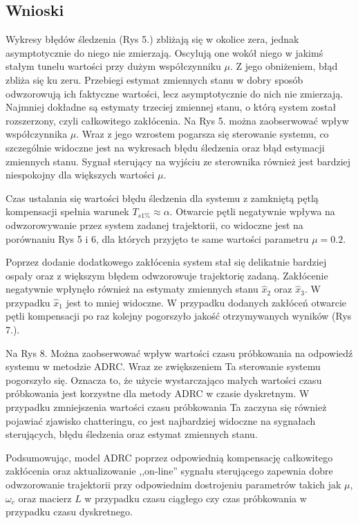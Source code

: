 \documentclass[10pt, a4paper]{article}
\begin{document}
\subsection{Wnioski}
Wykresy błędów śledzenia (Rys 5.) zbliżają się w okolice zera, jednak asymptotycznie do niego nie zmierzają. Oscylują one wokół niego w jakimś stałym tunelu wartości przy dużym współczynniku  $\mu$. Z jego obniżeniem, błąd zbliża się ku zeru. Przebiegi estymat zmiennych stanu w dobry sposób odwzorowują ich faktyczne wartości, lecz asymptotycznie do nich nie zmierzają. Najmniej dokładne są estymaty trzeciej zmiennej stanu, o którą system został rozszerzony, czyli całkowitego zakłócenia.
Na Rys 5. można zaobserwować wpływ współczynnika $\mu$. Wraz z jego wzrostem pogarsza się sterowanie systemu, co szczególnie widoczne jest na wykresach błędu śledzenia oraz błąd estymacji zmiennych stanu. Sygnał sterujący na wyjściu ze sterownika również jest bardziej niespokojny dla większych wartości $\mu$.

Czas ustalania się wartości błędu śledzenia dla systemu z zamkniętą pętlą kompensacji spełnia warunek $T_{s1\%}\approx \alpha$. Otwarcie pętli negatywnie wpływa na odwzorowywanie przez system zadanej trajektorii, co widoczne jest na porównaniu Rys 5 i 6, dla których przyjęto te same wartości parametru $\mu = 0.2$.

Poprzez dodanie dodatkowego zakłócenia system stał się delikatnie bardziej ospały oraz z większym błędem odwzorowuje trajektorię zadaną. Zakłócenie negatywnie wpłynęło również na estymaty zmiennych stanu $\hat{x}_2$ oraz $\hat{x}_3$. W przypadku $\hat{x}_1$ jest to mniej widoczne. W przypadku dodanych zakłóceń otwarcie pętli kompensacji po raz kolejny pogorszyło jakość otrzymywanych wyników (Rys 7.).

Na Rys 8. Można zaobserwować wpływ wartości czasu próbkowania na odpowiedź systemu w metodzie ADRC. Wraz ze zwiększeniem Ta sterowanie systemu pogorszyło się. Oznacza to, że użycie wystarczająco małych wartości czasu próbkowania jest korzystne dla metody ADRC w czasie dyskretnym. W  przypadku zmniejszenia wartości czasu próbkowania Ta zaczyna się również pojawiać zjawisko chatteringu, co jest najbardziej widoczne na sygnałach sterujących, błędu śledzenia oraz estymat zmiennych stanu. 

Podsumowując, model ADRC poprzez odpowiednią kompensację całkowitego zakłócenia oraz aktualizowanie ,,on-line'' sygnału sterującego zapewnia dobre odwzorowanie trajektorii przy odpowiednim dostrojeniu parametrów takich jak $\mu$, $\omega_c$ oraz macierz $L$ w przypadku czasu ciągłego czy czas próbkowania w przypadku czasu dyskretnego.
\end{document}
